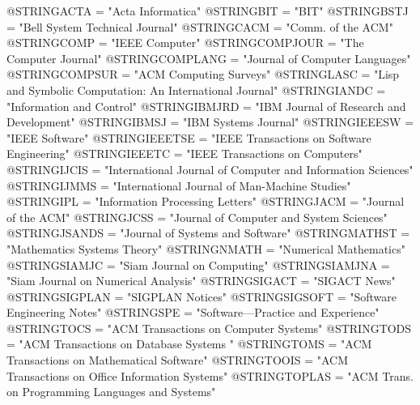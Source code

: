 

@STRING{ACTA = "Acta Informatica"}
@STRING{BIT = "BIT"}
@STRING{BSTJ = "Bell System Technical Journal"}
@STRING{CACM = "Comm. of the ACM"}
@STRING{COMP = "IEEE Computer"}
@STRING{COMPJOUR = "The Computer Journal"}
@STRING{COMPLANG = "Journal of Computer Languages"}
@STRING{COMPSUR = "ACM Computing Surveys"}
@STRING{LASC = "Lisp and Symbolic Computation: An International Journal"}
@STRING{IANDC = "Information and Control"}
@STRING{IBMJRD = "IBM Journal of Research and Development"}
@STRING{IBMSJ = "IBM Systems Journal"}
@STRING{IEEESW = "IEEE Software"}
@STRING{IEEETSE = "IEEE Transactions on Software Engineering"}
@STRING{IEEETC = "IEEE Transactions on Computers"}
@STRING{IJCIS = "International Journal of Computer and Information Sciences"}
@STRING{IJMMS = "International Journal of Man-Machine Studies"}
@STRING{IPL = "Information Processing Letters"}
@STRING{JACM = "Journal of the ACM"}
@STRING{JCSS = "Journal of Computer and System Sciences"}
@STRING{JSANDS = "Journal of Systems and Software"}
@STRING{MATHST = "Mathematics Systems Theory"}
@STRING{NMATH = "Numerical Mathematics"}
@STRING{SIAMJC = "Siam Journal on Computing"}
@STRING{SIAMJNA = "Siam Journal on Numerical Analysis"}
@STRING{SIGACT = "SIGACT News"}
@STRING{SIGPLAN = "SIGPLAN Notices"}
@STRING{SIGSOFT = "Software Engineering Notes"}
@STRING{SPE = "Software---Practice and Experience"}
@STRING{TOCS = "ACM Transactions on Computer Systems"}
@STRING{TODS = "ACM Transactions on Database Systems "}
@STRING{TOMS = "ACM Transactions on Mathematical Software"}
@STRING{TOOIS = "ACM Transactions on Office Information Systems"}
@STRING{TOPLAS = "ACM Trans. on Programming Languages and Systems"}


